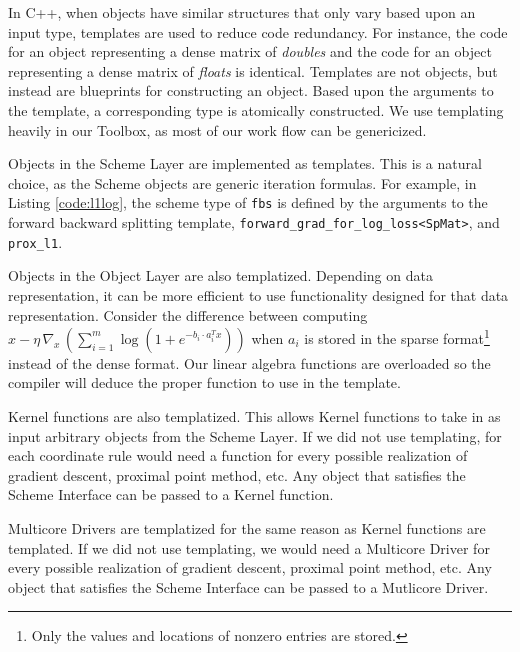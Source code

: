 In C++, when objects have similar structures that only vary based upon an input type, templates are used to reduce code redundancy. For instance, the code for an object representing a dense matrix of \emph{doubles} and the code for an object representing a dense matrix of \emph{floats} is identical.
Templates are not objects, but instead are blueprints for constructing an object.
Based upon the arguments to the template, a corresponding type is atomically constructed.
We use templating heavily in our Toolbox, as most of our work flow can be genericized.

Objects in the Scheme Layer are implemented as templates.
This is a natural choice, as the Scheme objects are generic iteration formulas.
For example, in Listing \ref{code:l1log}, the scheme type of \texttt{fbs} is defined by the arguments to the forward backward splitting template, \texttt{forward\_grad\_for\_log\_loss<SpMat>}, and \texttt{prox\_l1}.

Objects in the Object Layer are also templatized. Depending on data representation, it can be more efficient to use functionality designed for that data representation. Consider the difference between computing $x - \eta \, \nabla_x \,(\sum_{i = 1}^m \log (1 + e^{-b_i \cdot a_i^T x}))$ when $a_i$ is stored in the  sparse format\footnote{Only the values and locations of  nonzero entries are stored.} instead of the dense format.
Our linear algebra functions are overloaded so the compiler will deduce the proper function to use in the template.

Kernel functions are also templatized. This allows Kernel functions to take in as input arbitrary objects from the Scheme Layer. If we did not use templating, for each coordinate rule would need a function for every possible realization of gradient descent, proximal point method, etc.  Any object that satisfies the Scheme Interface can be passed to a Kernel function.

Multicore Drivers are templatized for the same reason as Kernel functions are templated. If we did not use templating, we would need a Multicore Driver for every possible realization of gradient descent, proximal point method, etc. Any object that satisfies the Scheme Interface can be passed to a Mutlicore Driver.

